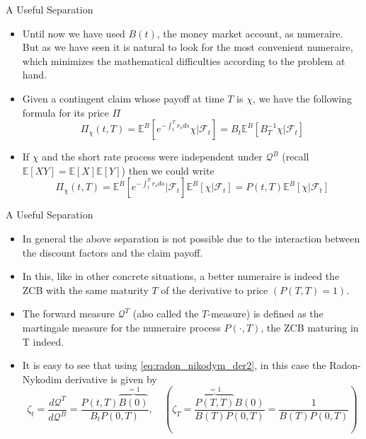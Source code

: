 \documentclass{beamer}
\begin{document}
\begin{frame}{A Useful Separation}
  \begin{itemize}
  \item<1-> Until now we have used $B(t)$, the money market account, as numeraire. But as we have seen it is natural to look for the most convenient numeraire, which minimizes the mathematical difficulties according to the problem at hand.
  \item<2-> Given a contingent claim whose payoff at time $T$ is $\chi$, we have the following formula for its price $\Pi$
    \begin{equation*}
      \Pi_\chi(t,T)=\mathbb{E}^B\left[e^{-\int_t^T r_s ds}\chi\bigg|\mathcal{F}_t \right]=B_t\mathbb{E}^B\left[B^{-1}_T\chi|\mathcal{F}_t\right]
    \end{equation*}
  \item<3-> If $\chi$ and the short rate process were independent under $\mathcal{Q}^B$ (recall $\mathbb{E}[XY]=\mathbb{E}[X]\mathbb{E}[Y]$) then we could write
    \begin{equation*}
      \Pi_\chi(t,T)=\mathbb{E}^B\left[e^{-\int_t^T r_s ds}\bigg|\mathcal{F}_t\right]\mathbb{E}^B\left[\chi|\mathcal{F}_t\right] = P(t,T)\mathbb{E}^B\left[\chi|\mathcal{F}_t\right]
    \end{equation*}
  \end{itemize}
\end{frame}

\begin{frame}{A Useful Separation}
  \begin{itemize}
  \item<1-> In general the above separation is not possible due to the interaction between the discount factors and the claim payoff. 
  \item<2-> In this, like in other concrete situations, a better numeraire is indeed the ZCB with the same maturity $T$ of the derivative to price $(P(T,T)=1)$.
  \item<3-> The forward measure $\mathcal{Q}^T$ (also called the $T$-measure) is defined as the martingale measure for the numeraire process $P(\cdot,T)$, the ZCB maturing in T indeed.
  \item<4-> It is easy to see that using \cref{eq:radon_nikodym_der2}, in this case the Radon-Nykodim derivative is given by
    \begin{equation}
      \zeta_t = \frac{d\mathcal{Q}^T}{d\mathcal{Q}^B} = \frac{P(t,T)\overbrace{B(0)}^{=1}}{B_t P(0,T)} ,\quad\left(\zeta_T=\frac{\overbrace{P(T,T)}^{=1}B(0)}{B(T)P(0,T)}=\frac{1}{B(T)P(0,T)}\right)
      \label{eq:radon_nikodym_t_forward}
    \end{equation}
  \end{itemize}
\end{frame}
\end{document}
